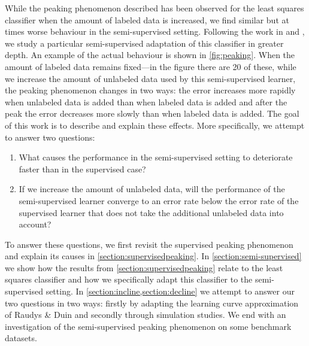 \documentclass[runningheads,a4paper]{llncs}\usepackage[]{graphicx}\usepackage[]{color}
\begin{document}
While the peaking phenomenon described has been observed for the least squares classifier when the amount of labeled data is increased, we find similar but at times worse behaviour in the semi-supervised setting.  Following the work in \cite{Duin1995} and \cite{Fan2008}, we study a particular semi-supervised adaptation of this classifier in greater depth. An example of the actual behaviour is shown in \cref{fig:peaking}. When the amount of labeled data remains fixed---in the figure there are 20 of these, while we increase the amount of unlabeled data used by this semi-supervised learner, the peaking phenomenon changes in two ways: the error increases more rapidly when unlabeled data is added than when labeled data is added and after the peak the error decreases more slowly than when labeled data is added. The goal of this work is to describe and explain these effects. More specifically, we attempt to answer two questions:
\begin{enumerate}
\item What causes the performance in the semi-supervised setting to deteriorate faster than in the supervised case?
\item If we increase the amount of unlabeled data, will the performance of the semi-supervised learner converge to an error rate below the error rate of the supervised learner that does not take the additional unlabeled data into account?
\end{enumerate}
To answer these questions, we first revisit the supervised peaking phenomenon and explain its causes in \cref{section:supervisedpeaking}. In \cref{section:semi-supervised} we show how the results from \cref{section:supervisedpeaking} relate to the least squares classifier and how we specifically adapt this classifier to the semi-supervised setting. In \cref{section:incline,section:decline} we attempt to answer our two questions in two ways: firstly by adapting the learning curve approximation of Raudys \& Duin \cite{Raudys1998} and secondly through simulation studies. We end with an investigation of the semi-supervised peaking phenomenon on some benchmark datasets.
\end{document}
